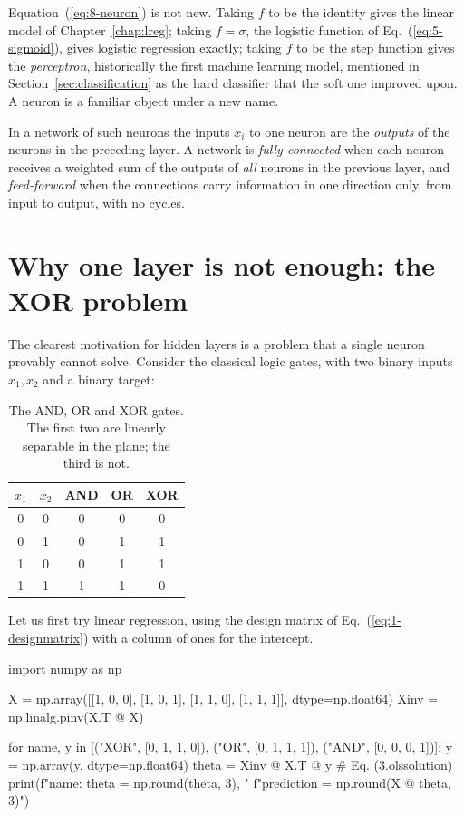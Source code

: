Equation~(\ref{eq:8-neuron}) is not new.  Taking $f$ to be the identity gives
the linear model of Chapter~\ref{chap:lreg}; taking $f=\sigma$, the logistic
function of Eq.~(\ref{eq:5-sigmoid}), gives logistic regression exactly; taking
$f$ to be the step function gives the \emph{perceptron}, historically the first
machine learning model, mentioned in Section~\ref{sec:classification} as the
hard classifier that the soft one improved upon.  A neuron is a familiar object
under a new name.

In a network of such neurons the inputs $x_i$ to one neuron are the
\emph{outputs} of the neurons in the preceding layer.  A network is
\emph{fully connected} when each neuron receives a weighted sum of the outputs
of \emph{all} neurons in the previous layer, and \emph{feed-forward} when the
connections carry information in one direction only, from input to output, with
no cycles.

\section{Why one layer is not enough: the XOR problem}
\label{sec:xor}

The clearest motivation for hidden layers is a problem that a single neuron
provably cannot solve.  Consider the classical logic gates, with two binary
inputs $x_1,x_2$ and a binary target:

\begin{table}[htbp]
\centering
\renewcommand{\arraystretch}{1.2}
\setlength{\tabcolsep}{10pt}
\begin{tabular}{cc|ccc}
\toprule
$x_1$ & $x_2$ & AND & OR & XOR\\
\midrule
0 & 0 & 0 & 0 & 0\\
0 & 1 & 0 & 1 & 1\\
1 & 0 & 0 & 1 & 1\\
1 & 1 & 1 & 1 & 0\\
\bottomrule
\end{tabular}
\caption{The AND, OR and XOR gates.  The first two are linearly separable in
the plane; the third is not.}
\label{tab:gates}
\end{table}

Let us first try linear regression, using the design matrix of
Eq.~(\ref{eq:1-designmatrix}) with a column of ones for the intercept.

\begin{Python}{}
import numpy as np

X = np.array([[1, 0, 0], [1, 0, 1], [1, 1, 0], [1, 1, 1]], dtype=np.float64)
Xinv = np.linalg.pinv(X.T @ X)

for name, y in [("XOR", [0, 1, 1, 0]), ("OR", [0, 1, 1, 1]), ("AND", [0, 0, 0, 1])]:
    y = np.array(y, dtype=np.float64)
    theta = Xinv @ X.T @ y                     # Eq. (3.olssolution)
    print(f"{name}: theta = {np.round(theta, 3)}, "
          f"prediction = {np.round(X @ theta, 3)}")
\end{Python}

